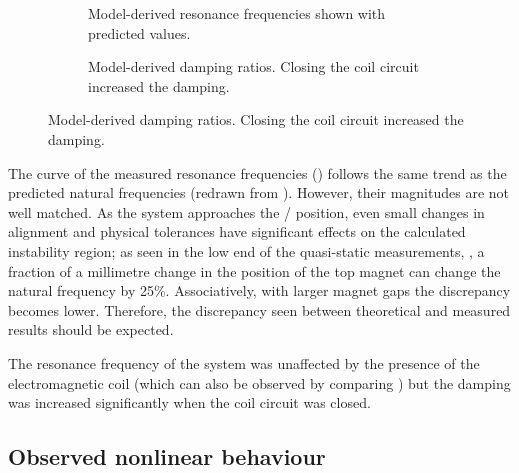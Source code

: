 \documentclass[11pt,a4paper]{memoir}
\begin{document}
\begin{figure}
  \begin{wide}
  \begin{subfigure}
    \caption{Model-derived resonance frequencies shown with predicted values.}
  \end{subfigure}
  \hfil
  \begin{subfigure}
    \caption{Model-derived damping ratios. Closing the coil circuit increased the damping.}
  \end{subfigure}
  \end{wide}
\end{figure}

The curve of the measured resonance frequencies () follows the same trend as the predicted  natural frequencies (redrawn from ).
However, their magnitudes are not well matched.
As the system approaches the \qzs/ position, even small changes in alignment and physical tolerances have significant effects on the calculated instability region; as seen in the low end of the quasi-static measurements, , a fraction of a millimetre change in the position of the top magnet can change the natural frequency by 25\%.
Associatively, with larger magnet gaps the discrepancy becomes lower.
Therefore, the discrepancy seen between theoretical and measured results should be expected.

The resonance frequency of the system was unaffected by the presence of the electromagnetic coil (which can also be observed by comparing ) but the damping was increased significantly when the coil circuit was closed.


\subsection{Observed nonlinear behaviour}
\end{document}
